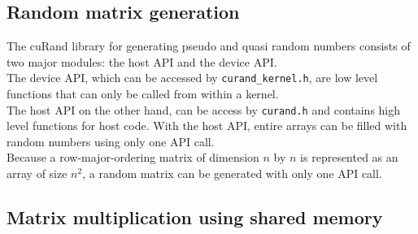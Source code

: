 \subsection*{Random matrix generation}
The cuRand library for generating pseudo and quasi random numbers consists of two major modules:
the host API and the device API.\\
The device API, which can be accessed by \texttt{curand\_kernel.h}, are low level functions that can only be called from within a kernel. \\
The host API on the other hand, can be access by \texttt{curand.h} and contains high level functions for host code. With the host API, entire arrays can be filled with random numbers using only one API call. \\
Because a row-major-ordering matrix of dimension $n$ by $n$ is represented as an array of size $n^2$, a random matrix can be generated with only one API call. 

\subsection*{Matrix multiplication using shared memory}

